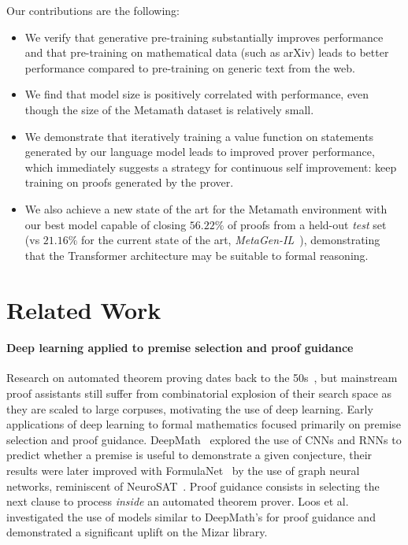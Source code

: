 Our contributions are the following:

\begin{itemize}

\item We verify that generative pre-training substantially improves performance and that pre-training on mathematical data (such as arXiv) leads to better performance compared to pre-training on generic text from the web. 
\item We find that model size is positively correlated with performance, even though the size  of the Metamath dataset is relatively small. 
\item We demonstrate that iteratively training a value function on statements generated by our language model leads to improved prover performance, which immediately suggests a strategy for continuous self improvement: keep training on proofs generated by the prover.
\item We also achieve a new state of the art for the Metamath environment with our best model capable of closing $56.22\%$ of proofs from a held-out \textit{test} set (vs $21.16\%$ for the current state of the art, \textit{MetaGen-IL}~\cite{wang2020learning}), demonstrating that the Transformer architecture may be suitable to formal reasoning.
\end{itemize}

\section{Related Work}

\paragraph{Deep learning applied to premise selection and proof guidance} Research on automated theorem proving dates back to the 50s~\cite{harrison2014history}, but mainstream proof assistants still suffer from combinatorial explosion of their search space as they are scaled to large corpuses, motivating the use of deep learning. Early applications of deep learning to formal mathematics focused primarily on premise selection and proof guidance. DeepMath~\cite{irving2016deepmath} explored the use of CNNs and RNNs to predict whether a premise is useful to demonstrate a given conjecture, their results were later improved with FormulaNet~\cite{wang2017premise} by the use of graph neural networks, reminiscent of NeuroSAT~\cite{selsam2018learning}. Proof guidance consists in selecting the next clause to process \textit{inside} an automated theorem prover. Loos et al.~\cite{loos2017deep} investigated the use of models similar to DeepMath's for proof guidance and demonstrated a significant uplift on the Mizar library.

